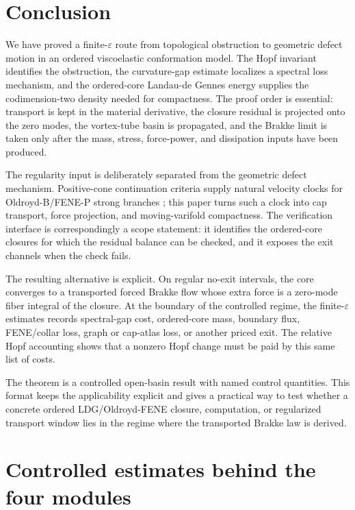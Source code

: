 \documentclass[11pt]{article}
\theoremstyle{definition}
\newcommand{\eps}{\varepsilon}
\begin{document}
\section{Conclusion}
\label{sec:conclusion}

We have proved a finite-\(\eps\) route from topological obstruction to geometric
defect motion in an ordered viscoelastic conformation model.  The Hopf invariant
identifies the obstruction, the curvature-gap estimate localizes a spectral
loss mechanism, and the ordered-core Landau-de Gennes energy supplies the
codimension-two density needed for compactness.  The proof order is essential:
transport is kept in the material derivative, the closure residual is projected
onto the zero modes, the vortex-tube basin is propagated, and the Brakke limit
is taken only after the mass, stress, force-power, and dissipation inputs have
been produced.

The regularity input is deliberately separated from the geometric defect
mechanism.  Positive-cone continuation criteria supply natural
velocity clocks for Oldroyd-B/FENE-P strong branches
\cite{PengBlowUp2026,PengPositiveCone3D2026}; this paper turns such a clock into
cap transport, force projection, and moving-varifold compactness.  The
verification interface is correspondingly a scope statement: it identifies the
ordered-core closures for which the residual balance can be checked, and it
exposes the exit channels when the check fails.

The resulting alternative is explicit.  On regular no-exit intervals, the core
converges to a transported forced Brakke flow whose extra force is a zero-mode
fiber integral of the closure.  At the boundary of the controlled regime, the
finite-\(\eps\) estimates records spectral-gap cost, ordered-core mass, boundary
flux, FENE/collar loss, graph or cap-atlas loss, or another priced exit.  The
relative Hopf accounting shows that a nonzero Hopf change must be paid by this
same list of costs.

The theorem is a controlled open-basin result with named control quantities.  This format
keeps the applicability explicit and gives a practical way to test whether a
concrete ordered LDG/Oldroyd-FENE closure, computation, or regularized transport
window lies in the regime where the transported Brakke law is derived.

\appendix

\section{Controlled estimates behind the four modules}
\label{app:controlled-estimates}
\end{document}

